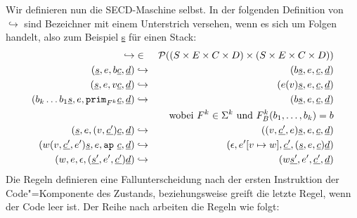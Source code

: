 Wir definieren nun die SECD-Maschine selbst. In der folgenden
Definition von $\hookrightarrow$ sind Bezeichner mit einem Unterstrich
versehen, wenn es sich um Folgen handelt, also zum Beispiel \underline{s} für
einen Stack:
%
\begin{eqnarray}
  \hookrightarrow &\in& \mathcal{P}((S\times E\times C\times D) \times (S\times E\times C\times D))\notag\\
  (\underline{s}, e, b\underline{c}, \underline{d})
  &\hookrightarrow& 
  (b\underline{s}, e, \underline{c}, \underline{d})
  \label{secd:base}
  \\
  (\underline{s}, e, v\underline{c}, \underline{d})
  &\hookrightarrow&
  (e(v)\underline{s}, e, \underline{c}, \underline{d})
  \label{secd:variable}
  \\
  (b_k\ldots b_1 \underline{s}, e, \mathtt{prim}_{F^k}\underline{c}, \underline{d})
  &\hookrightarrow&
  (b\underline{s}, e, \underline{c}, \underline{d})
  \label{secd:prim}
  \\ && \textrm{wobei $F^k\in\Sigma^k$ und $F^k_B(b_1,\ldots,b_k) = b$}\notag
  \\
  (\underline{s}, e, (v, \underline{c'}) \underline{c}, \underline{d})
  &\hookrightarrow&
  ((v, \underline{c'}, e) \underline{s}, e, \underline{c}, \underline{d})
  \label{secd:abstraction}
  \\
  (w (v,\underline{c'}, e') \underline{s}, e, \mathtt{ap}~\underline{c}, \underline{d})
  &\hookrightarrow&
  (\epsilon, e'[v\mapsto w], \underline{c'}, (\underline{s}, e, \underline{c}) \underline{d})
  \label{secd:app}
  \\
  (w, e, \epsilon, (\underline{s'}, e', \underline{c'}) \underline{d})
  &\hookrightarrow&
  (w\underline{s'}, e', \underline{c'}, \underline{d})
  \label{secd:return}
\end{eqnarray}
%
Die Regeln definieren eine Fallunterscheidung nach der ersten
Instruktion der Code"=Komponente des Zustands, beziehungsweise greift die letzte
Regel, wenn der Code leer ist.  Der Reihe nach arbeiten die Regeln wie
folgt:
%
